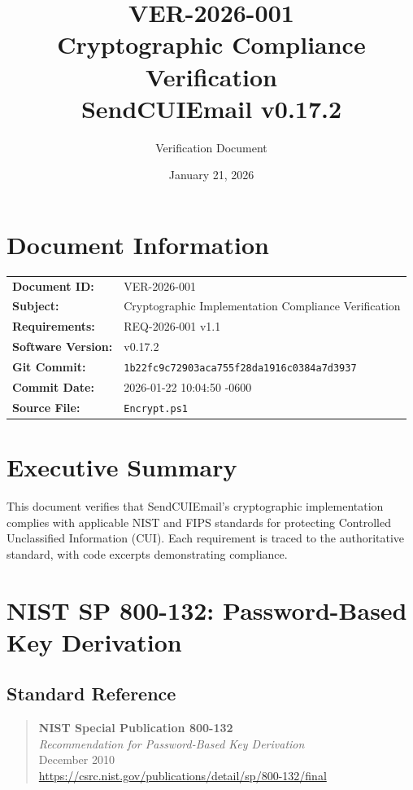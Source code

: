 \documentclass[11pt,letterpaper]{article}
\title{
    \textbf{VER-2026-001} \\
    \Large Cryptographic Compliance Verification \\
    \large SendCUIEmail v0.17.2
}
\author{Verification Document}
\date{January 21, 2026}
\begin{document}
\maketitle

\section*{Document Information}

\begin{tabular}{ll}
\textbf{Document ID:} & VER-2026-001 \\
\textbf{Subject:} & Cryptographic Implementation Compliance Verification \\
\textbf{Requirements:} & REQ-2026-001 v1.1 \\
\textbf{Software Version:} & v0.17.2 \\
\textbf{Git Commit:} & \texttt{1b22fc9c72903aca755f28da1916c0384a7d3937} \\
\textbf{Commit Date:} & 2026-01-22 10:04:50 -0600 \\
\textbf{Source File:} & \texttt{Encrypt.ps1} \\
\end{tabular}

\section*{Executive Summary}

This document verifies that SendCUIEmail's cryptographic implementation complies with applicable NIST and FIPS standards for protecting Controlled Unclassified Information (CUI). Each requirement is traced to the authoritative standard, with code excerpts demonstrating compliance.

\tableofcontents
\newpage

\section{NIST SP 800-132: Password-Based Key Derivation}

\subsection{Standard Reference}

\begin{quote}
\textbf{NIST Special Publication 800-132} \\
\textit{Recommendation for Password-Based Key Derivation} \\
December 2010 \\
\url{https://csrc.nist.gov/publications/detail/sp/800-132/final}
\end{quote}
\end{document}
